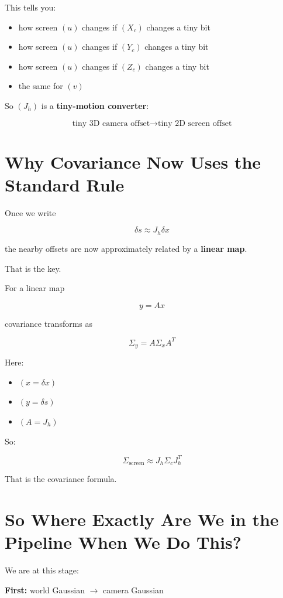 \documentclass[11pt,letterpaper]{article}
\begin{document}
This tells you:

\begin{itemize}
\item how screen $(u)$ changes if $(X_c)$ changes a tiny bit
\item how screen $(u)$ changes if $(Y_c)$ changes a tiny bit
\item how screen $(u)$ changes if $(Z_c)$ changes a tiny bit
\item the same for $(v)$
\end{itemize}

So $(J_h)$ is a \textbf{tiny-motion converter}:

\[
\text{tiny 3D camera offset} \to \text{tiny 2D screen offset}
\]

\section{Why Covariance Now Uses the Standard Rule}

Once we write

\[
\delta s \approx J_h \delta x
\]

the nearby offsets are now approximately related by a \textbf{linear map}.

That is the key.

For a linear map

\[
y = A x
\]

covariance transforms as

\[
\Sigma_y = A \Sigma_x A^T
\]

Here:

\begin{itemize}
\item $(x = \delta x)$
\item $(y = \delta s)$
\item $(A = J_h)$
\end{itemize}

So:

\[
\Sigma_{\text{screen}} \approx J_h \Sigma_c J_h^T
\]

That is the covariance formula.

\section{So Where Exactly Are We in the Pipeline When We Do This?}

We are at this stage:

\textbf{First:} world Gaussian $\to$ camera Gaussian
\end{document}
